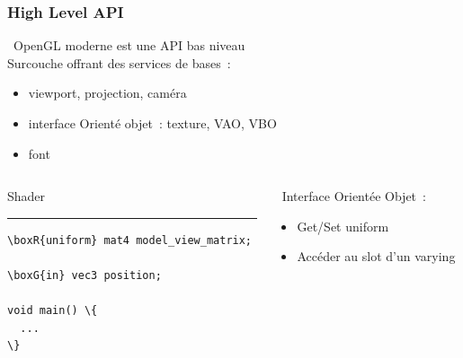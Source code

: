 \begin{frame}[fragile]
  \frametitle{High Level API}
   \ OpenGL moderne est une API bas niveau \\
  Surcouche offrant des services de bases~:
  \begin{itemize}
  \item viewport, projection, caméra
  \item interface Orienté objet~: texture, VAO, VBO
  \item font
  \end{itemize}
  \vspace{2em}
  \begin{center}
    \begin{columns}
      \begin{column}{.35\textwidth}
        \begin{center}
          Shader
          \rule{\textwidth}{1pt}
          {\scriptsize
\begin{Verbatim}[commandchars=\\\{\}]
\boxR{uniform} mat4 model_view_matrix;

\boxG{in} vec3 position;

void main() \{
  ...
\}
\end{Verbatim}
          }
        \end{center}
      \end{column}
      \begin{column}{.5\textwidth}
         \ Interface Orientée Objet~:
        \begin{itemize}
        \item Get/Set uniform \\
        \item Accéder au slot d'un varying \\
        \end{itemize}
      \end{column}
    \end{columns}
  \end{center}
  \note{
    \begin{enumerate}
    \item 
    \end{enumerate}
  }
\end{frame}

